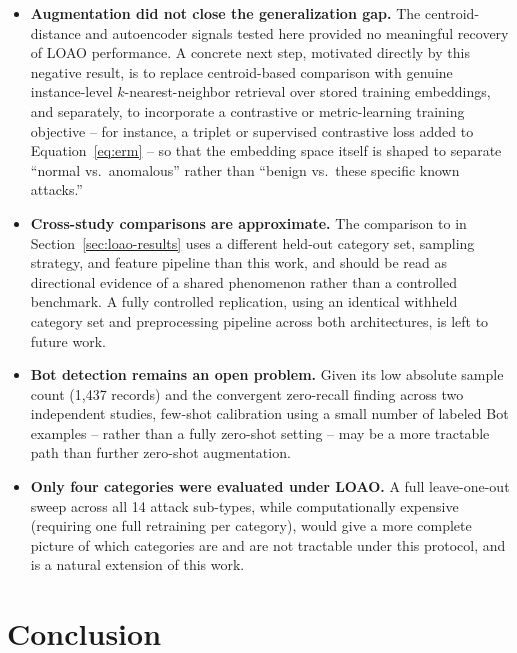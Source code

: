\documentclass[11pt]{article}
\begin{document}
\begin{itemize}[leftmargin=*]
\item \textbf{Augmentation did not close the generalization gap.} The centroid-distance and
autoencoder signals tested here provided no meaningful recovery of LOAO performance. A concrete
next step, motivated directly by this negative result, is to replace centroid-based comparison with
genuine instance-level $k$-nearest-neighbor retrieval over stored training embeddings, and
separately, to incorporate a contrastive or metric-learning training objective -- for instance, a
triplet or supervised contrastive loss added to Equation~\ref{eq:erm} -- so that the embedding space
itself is shaped to separate ``normal vs.\ anomalous'' rather than ``benign vs.\ these specific known
attacks.''
\item \textbf{Cross-study comparisons are approximate.} The comparison to \cite{xu2025} in
Section~\ref{sec:loao-results} uses a different held-out category set, sampling strategy, and
feature pipeline than this work, and should be read as directional evidence of a shared phenomenon
rather than a controlled benchmark. A fully controlled replication, using an identical withheld
category set and preprocessing pipeline across both architectures, is left to future work.
\item \textbf{Bot detection remains an open problem.} Given its low absolute sample count (1{,}437
records) and the convergent zero-recall finding across two independent studies, few-shot calibration
using a small number of labeled Bot examples -- rather than a fully zero-shot setting -- may be a
more tractable path than further zero-shot augmentation.
\item \textbf{Only four categories were evaluated under LOAO.} A full leave-one-out sweep across
all 14 attack sub-types, while computationally expensive (requiring one full retraining per
category), would give a more complete picture of which categories are and are not tractable under
this protocol, and is a natural extension of this work.
\end{itemize}

\section{Conclusion}
\label{sec:conclusion}
\end{document}
